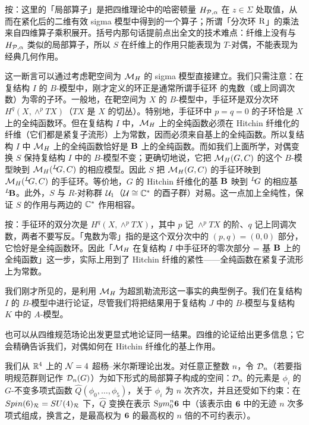 \begin{yizhu}[含糊点拨]
按：这里的「局部算子」是把四维理论中的哈密顿量 $H_{{\cal P},\alpha}$ 在 $z\in\Sigma$ 处取值，从而在紧化后的二维有效 sigma 模型中得到的一个算子；所谓「分次环 ${{\eurm R}}$」的乘法来自四维算子乘积展开。括号内那句话提前点出全文的技术难点：纤维上没有与 $H_{{\cal P},\alpha}$ 类似的局部算子，所以 $S$ 在纤维上的作用只能表现为 $T$-对偶，不能表现为经典几何作用。
\end{yizhu}

这一断言可以通过考虑靶空间为 $\MH$ 的 sigma 模型直接建立。我们只需注意：在复结构 $I$ 的 $B$-模型中，刚才定义的环正是通常所谓手征环 \cite{ref78} 的鬼数（或上同调次数）为零的子环。一般地，在靶空间为 $X$ 的 $B$-模型中，手征环是双分次环 $H^q(X,\wedge^pTX)$（$TX$ 是 $X$ 的切丛）。特别地，手征环中 $p=q=0$ 的子环恰是 $X$ 上的全纯函数环。但在复结构 $I$ 中，$\MH$ 上的全纯函数必须在 Hitchin 纤维化的纤维（它们都是紧复子流形）上为常数，因而必须来自基上的全纯函数。所以复结构 $I$ 中 $\MH$ 上的全纯函数恰好是 ${\EUBB}$ 上的全纯函数。而如我们上面所学，对偶变换 $S$ 保持复结构 $I$ 中的 $B$-模型不变；更确切地说，它把 $\MH(G,C)$ 的这个 $B$-模型映到 $\MH(^L\negthinspace G,C)$ 的相应模型。因此 $S$ 把 $\MH(G,C)$ 的手征环映到 $\MH(^L\negthinspace G,C)$ 的手征环。等价地，$G$ 的 Hitchin 纤维化的基 ${\EUBB}$ 映到 $^L\negthinspace G$ 的相应基 $^L\negthinspace{\EUBB}$。此外，$S$ 与 $R$-对称群 ${\cal U}_1$（${\cal U}\cong \Bbb{C}^*$ 的酉子群）对易。这一点加上全纯性，保证 $S$ 的作用与两边的 $\Bbb{C}^*$ 作用相容。

\begin{yizhu}[易错点]
按：手征环的双分次是 $H^q(X,\wedge^pTX)$，其中 $p$ 记 $\wedge^pTX$ 的阶、$q$ 记上同调次数，两者不要写反。「鬼数为零」指的是这个双分次中的 $(p,q)=(0,0)$ 部分，它恰好是全纯函数环。因此「$\MH$ 在复结构 $I$ 中手征环的零次部分 = 基 ${\EUBB}$ 上的全纯函数」这一步，实际上用到了 Hitchin 纤维的紧性——全纯函数在紧复子流形上为常数。
\end{yizhu}

我们刚才所见的，是利用 $\MH$ 为超凯勒流形这一事实的典型例子。我们在复结构 $I$ 的 $B$-模型中进行论证，尽管我们将把结果用于复结构 $J$ 中的 $B$-模型与复结构 $K$ 中的 $A$-模型。

也可以从四维规范场论出发更显式地论证同一结果。四维的论证给出更多信息；它会精确告诉我们，对偶如何在 Hitchin 纤维化的基上作用。

我们从 $\Bbb{R}^4$ 上的 ${\EUN}=4$ 超杨--米尔斯理论出发。对任意正整数 $n$，令 ${\EUD}_n$（若要指明规范群则记作 ${\EUD}_n(G)$）为如下形式的局部算子构成的空间：${\EUD}_n$ 的元素是 $\phi_i$ 的 $G$-不变多项式函数 ${\hat Q}(\phi_0,\dots,\phi_5)$，关于 $\phi_i$ 为 $n$ 次齐次，并且还受如下约束：在 $Spin(6)_{\cal R}=SU(4)_{\cal R}$ 下，$\hat Q$ 变换在表示 ${\rm Sym}_0^n{\bf 6}$ 中（该表示由 ${\bf 6}$ 中的无迹 $n$ 次多项式组成，换言之，是最高权为 ${\bf 6}$ 的最高权的 $n$ 倍的不可约表示）。

